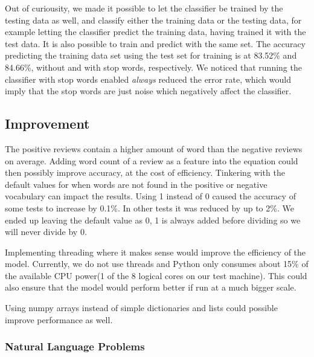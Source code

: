 \documentclass[a4paper,12pt]{article}
\begin{document}
Out of curiousity, we made it possible to let the classifier be trained by the testing data as well, and classify either the training data or the testing data, for example letting the classifier predict the training data, having trained it with the test data. It is also possible to train and predict with the same set. The accuracy predicting the training data set using the test set for training is at 83.52\% and 84.66\%, without and with stop words, respectively. 
We noticed that running the classifier with stop words enabled \textit{always} reduced the error rate, which would imply that the stop words are just noise which negatively affect the classifier.

\subsection{Improvement}

The positive reviews contain a higher amount of word than the negative reviews on average. Adding word count of a review as a feature into the equation could then possibly improve accuracy, at the cost of efficiency. Tinkering with the default values for when words are not found in the positive or negative vocabulary can impact the results. Using 1 instead of 0 caused the accuracy of some tests to increase by 0.1\%. In other tests it was reduced by up to 2\%. We ended up leaving the default value as 0, 1 is always added before dividing so we will never divide by 0.

Implementing threading where it makes sense would improve the efficiency of the model. Currently, we do not use threads and Python only consumes about 15\% of the available CPU power(1 of the 8 logical cores on our test machine). This could also ensure that the model would perform better if run at a much bigger scale. 

Using numpy arrays instead of simple dictionaries and lists could possible improve performance as well.
\subsubsection{Natural Language Problems}
\end{document}
